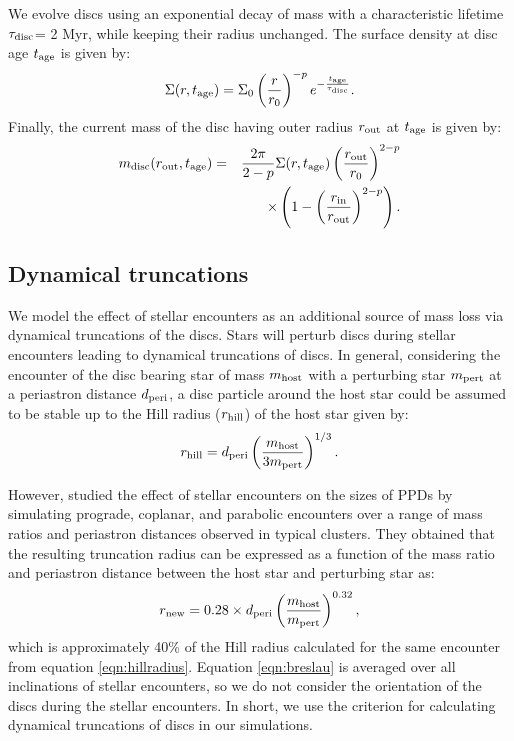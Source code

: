 \documentclass[fleqn,usenatbib]{mnras}
\newcommand\taudisc{\ensuremath{\tau_{\rm disc}}\xspace}  %
\begin{document}
We evolve discs using an exponential decay of mass with a characteristic lifetime \taudisc = 2 Myr, while keeping their radius unchanged. The surface density at disc age $t_{\rm{age}}$ is given by:
\begin{equation}
    \Sigma (r,t_{\rm{age}})= \Sigma_0 \left( \frac{r}{r_0}\right)^{-p}  e^{-\frac{t_{\rm{age}}}{\taudisc}}.
    \label{eqn:evolvingsurfacedensity}
\end{equation}
Finally, the current mass of the disc having outer radius $r_{\rm out}$ at $t_{\rm{age}}$ is given by:
\begin{eqnarray}
    m_{\rm{disc}} (r_{\rm out},t_{\rm{age}}) &=& \frac{2\pi}{2-p} \Sigma (r, t_{\rm{age}}) \left( \frac{r_{\rm out}}{r_0} \right)^{2-p} \nonumber \\ 
    & & \times  \left( 1-\left(\frac{r_{\rm in}}{r_{\rm out}} \right)^{2-p} \right).
    \label{eqn:currentmass}
\end{eqnarray}

\subsection{Dynamical truncations}
\label{subsec:dynamicalfeedback-primordialfeedback}

We model the effect of stellar encounters as an additional source of mass loss via dynamical truncations of the discs. Stars will perturb discs during stellar encounters leading to dynamical truncations of discs. In general, considering the encounter of the disc bearing star of mass $m_{\rm host}$ with a perturbing star $m_{\rm pert}$ at a periastron distance $d_{\rm peri}$, a disc particle around the host star could be assumed to be stable up to the Hill radius ($r_{\rm hill}$) of the host star \citep{Hamilton1991Icar...92..118H} given by:
\begin{equation}
  r_{\rm hill} = d_{\rm peri} \left( \frac{m_{\rm host}}{3m_{\rm pert}}\right)^{1/3}.
  \label{eqn:hillradius}
\end{equation}

However, \cite{Breslau2014A&A...565A.130B} studied the effect of stellar encounters on the sizes of PPDs by simulating prograde, coplanar, and parabolic encounters over a range of mass ratios and periastron distances observed in typical clusters. They obtained that the resulting truncation radius can be expressed as a function of the mass ratio and periastron distance between the host star and perturbing star as:
\begin{equation}
    r_{\rm new} = 0.28 \times d_{\rm peri} \left( \frac{m_{\rm host}}{m_{\rm pert}}\right)^{0.32},
    \label{eqn:breslau}
\end{equation}
which is approximately 40\% of the Hill radius calculated for the same encounter from equation \ref{eqn:hillradius}. Equation \ref{eqn:breslau} is averaged over all inclinations of stellar encounters, so we do not consider the orientation of the discs during the stellar encounters. In short, we use the \cite{Breslau2014A&A...565A.130B} criterion for calculating dynamical truncations of discs in our simulations. 
\end{document}
